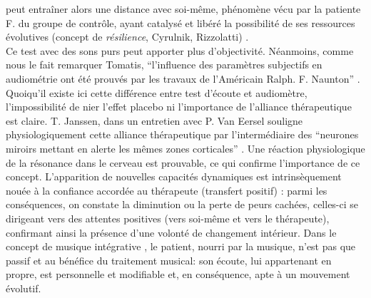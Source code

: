 \begin{itemize}
  	peut entraîner alors une distance avec
  	soi-même, phénomène vécu  par 
  	la  patiente F.  du groupe de contrôle, ayant catalysé et libéré
  	la possibilité de ses ressources évolutives (concept de \textit{résilience}, Cyrulnik, Rizzolatti) 
  	\autocite[27--63]{van_eersel_cerveau}.
  	 \\	
  		Ce test avec des sons purs peut apporter plus d'objectivité. Néanmoins, comme nous le fait 
  		remarquer 
  Tomatis,
  \enquote{l'influence des paramètres subjectifs en audiométrie ont été prouvés par les travaux de 
  	l'Américain Ralph. F. Naunton}  \autocite [69]{tomatisoreilletvie}. Quoiqu'il existe ici cette différence 
  entre 
  test d'écoute et audiomètre,
  l'impossibilité  de nier l'effet placebo ni l'importance de  
  l'alliance 
  thérapeutique est claire.
  T. Janssen, dans un entretien
  avec P. Van Eersel
  souligne physiologiquement cette alliance thérapeutique
  par l'intermédiaire des ``{neurones
  	miroirs mettant en alerte les mêmes zones corticales}'' \autocite[203]{van_eersel_cerveau}.
  Une réaction physiologique de la résonance dans le cerveau est prouvable, ce qui confirme 
  l'importance 
  de ce concept. 
  \newline 
  L'apparition de nouvelles
  capacités  dynamiques est intrinsèquement nouée à la confiance
  accordée au thérapeute (transfert positif)
  \autocite{roustang1986} : parmi les conséquences, on constate la
  diminution ou la perte de peurs cachées, celles-ci se dirigeant vers des
  attentes positives (vers soi-même et vers le thérapeute), confirmant ainsi la
  présence d'une volonté de changement intérieur.
  Dans le concept de musique intégrative \autocite{vrait_musicotherapie_2018},  le patient, nourri par
  la musique, n'est pas que passif et
  au bénéfice  du traitement musical: son écoute, lui
  appartenant en propre, est personnelle et modifiable %
  et, en conséquence, apte à un mouvement évolutif.

\end{itemize}
